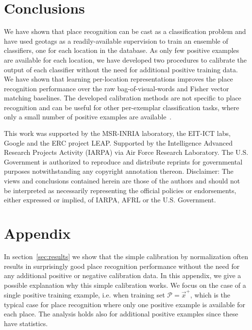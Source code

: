 \section{Conclusions}
We have shown that place recognition can be cast as a classification problem and have used geotags as a readily-available supervision to
train an ensemble of classifiers, one for each location in the database. As only few positive examples are available for each
location, we have developed two procedures to calibrate the output of each classifier without the need for additional positive training
data. We have shown that learning per-location representations improves the place recognition performance over the raw bag-of-visual-words and
Fisher vector matching baselines. The developed calibration methods are not specific to place recognition and can be useful for other
per-exemplar classification tasks, where only a small number of positive examples are available~\cite{Malisiewicz11}.



\begin{acknowledgements}
   This work was supported by the MSR-INRIA laboratory, the EIT-ICT labs, Google and the ERC project LEAP.
   {
   \noindent
   Supported by the Intelligence Advanced Research Projects Activity (IARPA) via Air Force Research Laboratory. The U.S. Government is authorized to reproduce and distribute reprints for governmental purposes notwithstanding any copyright annotation thereon. Disclaimer:  The views and conclusions contained herein are those of the authors and should not be interpreted as necessarily representing the official policies or endorsements, either expressed or implied, of IARPA, AFRL or the U.S. Government.
   }
\end{acknowledgements}




{\footnotesize

}

  \section*{Appendix} %
    In section~\ref{sec:results} we show that the simple calibration by normalization often results in surprisingly good place recognition performance without the need for any additional positive or negative calibration data. In this \textcolor{petr}{appendix}, we give a possible explanation why this simple calibration works.  We focus on the case of a single positive training example, i.e. when training set $\mathcal P = \vec{x}^{+}$, which is the typical case for place recognition where only one 
    \textcolor{petr}{positive example is available for each place. The analysis holds also for additional positive examples since these have statistics}. 

